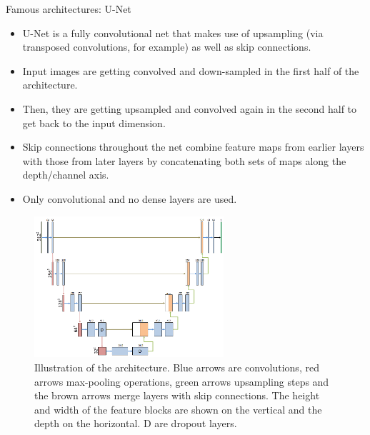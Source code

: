 \begin{vbframe}{Famous architectures:  U-Net}

      \begin{itemize}
        \item U-Net is a fully convolutional net that makes use of upsampling (via transposed convolutions, for example) as well as skip connections.
        \item Input images are getting convolved and down-sampled in the first half of the architecture.
        \item Then, they are getting upsampled and convolved again in the second half to get back to the input dimension.
        \item Skip connections throughout the net combine feature maps from earlier layers with those from later layers by concatenating both sets of maps along the depth/channel axis.
        \item Only convolutional and no dense layers are used.
    \end{itemize}
\framebreak
    \begin{figure}
        \centering
        \includegraphics[width=7cm]{plots/outlook/unet.png}
        \caption{Illustration of the architecture. Blue arrows are convolutions, red arrows max-pooling operations, green arrows upsampling steps and the brown arrows merge layers with skip connections. The height and width of the feature blocks are shown on the vertical and the depth on the horizontal. D are dropout layers.}
    \end{figure}
    
\end{vbframe}

